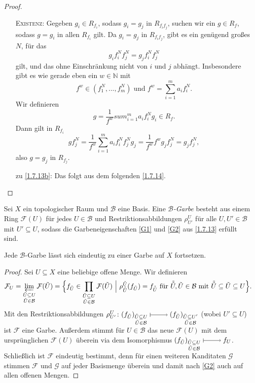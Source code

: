 \documentclass[a4paper,12pt]{scrbook}
\newtheorem{proof}{Beweis}
\def\B{\mathcal{B}}
\newcommand{\F}{\mathcal{F}}
\def\G{\mathcal{G}}
\renewcommand{\dotsc}{\ensuremath{\!...}}
\newcommand{\set}[1]{\ensuremath{\mathbb{#1}}}
\newcommand{\N}{\set{N}}
\renewcommand{\mapsto}{\raisebox{-1pt}{\tikz{\draw[thin,shorten >=3pt, |->] (0,0) node{\hspace*{0pt}} -- node{} (1,0);}}\penalty1000\relax}
\begin{document}
\begin{proof}
\begin{enumerate}
    \textsc{Existenz}: Gegeben $g_i\in R_{f_i}$, sodass $g_i=g_j$ in $R_{f_if_j}$, suchen wir ein $g\in R_f$, sodass $g=g_i$ in
    allen $R_{f_i}$ gilt. Da $g_i=g_j$ in $R_{f_if_j}$, gibt es ein genügend großes $N$, für das \[g_if_i^Nf_j^N=g_jf_i^Nf_j^N\] gilt,
    und das ohne Einschränkung nicht von $i$ und $j$ abhängt. Insbesondere gibt es wie gerade eben ein $w\in\N$ mit
    \[f^w\in(f_1^N,\dotsc,f_m^N)\text{ und }f^w=\sum_{i=1}^ma_if_i^N.\] 
    Wir definieren 
    \[g=\frac{1}{f^w}sum_{i=1}^ma_if_i^Ng_i\in R_f.\] 
    Dann gilt in $R_{f_i}$
    \[ gf_j^N=\frac{1}{f^w}\sum_{i=1}^ma_if_i^Nf_j^Ng_j=\frac{1}{f^w}f^wg_jf_j^N=g_jf_j^N, \]
    also $g=g_j$ in $R_{f_j}$.
  \item [zu] \ref{1.7.13b}: Das folgt aus dem folgenden \cref{1.7.14}.
  \end{enumerate}
\end{proof}

\begin{lem}\label{1.7.14}
  Sei $X$ ein topologischer Raum und $\B$ eine Basis. Eine \emph{$\B$-Garbe} besteht aus einem Ring
  $\F(U)$ für jedes $U\in\B$ und Restriktionsabbildungen $\rho_{U'}^U$ für alle $U,U'\in\B$ mit
  $U'\subseteq U$, sodass die Garbeneigenschaften \ref{G1} und \ref{G2} aus \cref{1.7.13} erfüllt sind.

  Jede $\B$-Garbe lässt sich eindeutig zu einer Garbe auf $X$ fortsetzen.
\end{lem}
\begin{proof}
  Sei $U\subseteq X$ eine beliebige offene Menge. Wir definieren
  \[ \F_U = \varprojlim_{\substack{\tilde{U}\subseteq U\\\tilde{U}\in\B}}\F(\tilde{U}) =
     \Bigl\{f_{\tilde{U}}\in\prod_{\substack{\tilde{U}\subseteq U\\\tilde{U}\in\B}}\F(\tilde{U}) \ \Big|\ 
     \rho_{\tilde{\tilde{U}}}^{\tilde{U}}(f_{\tilde{U}})=f_{\tilde{\tilde{U}}}\text{ für }
     \tilde{\tilde{U}},\tilde{U}\in\B \text{ mit } \tilde{\tilde{U}}\subseteq\tilde{U}\subseteq U \Bigr\}. \]
     Mit den Restriktionsabbildungen
     $\rho_{U'}^U\colon (f_{\tilde{U}})_{\substack{\tilde{U}\subseteq U\\\tilde{U}\in\B}} \mapsto
     (f_{\tilde{U}})_{\substack{\tilde{U}\subseteq U'\\\tilde{U}\in\B}}$ (wobei $U'\subseteq U$) ist $\F$ eine
     Garbe. Außerdem stimmt für $U\in\B$ das neue $\F(U)$ mit dem ursprünglichen $\F(U)$ überein via
     dem Isomorphismus $(f_{\tilde{U}})_{\substack{\tilde{U}\subseteq U\\\tilde{U}\in\B}} \mapsto f_U$.
     Schließlich ist $\F$ eindeutig bestimmt, denn für einen weiteren Kanditaten $\G$ stimmen $\F$
     und $\G$ auf jeder Basismenge überein und damit nach \ref{G2} auch auf allen offenen Mengen.
\end{proof}
\end{document}
